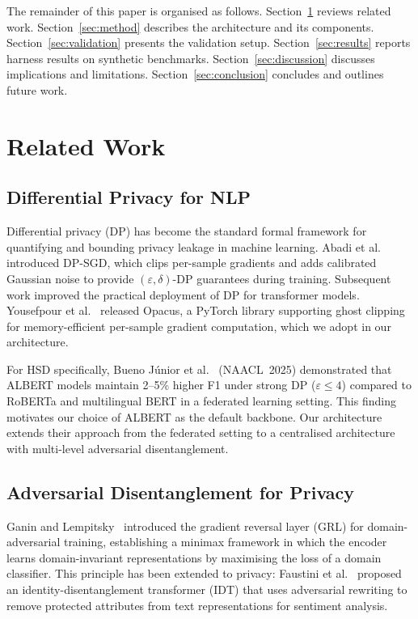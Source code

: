 \documentclass{article}
\begin{document}
\noindent
The remainder of this paper is organised as follows.
Section~\ref{sec:related} reviews related work.
Section~\ref{sec:method} describes the architecture and its components.
Section~\ref{sec:validation} presents the validation setup.
Section~\ref{sec:results} reports harness results on synthetic benchmarks.
Section~\ref{sec:discussion} discusses implications and limitations.
Section~\ref{sec:conclusion} concludes and outlines future work.


\section{Related Work}
\label{sec:related}

\subsection{Differential Privacy for NLP}

Differential privacy (DP) has become the standard formal framework for
quantifying and bounding privacy leakage in machine learning.
Abadi et al.~\cite{abadi2016deep} introduced DP-SGD, which clips
per-sample gradients and adds calibrated Gaussian noise to provide
$(\varepsilon,\delta)$-DP guarantees during training.
Subsequent work improved the practical deployment of DP for transformer
models. Yousefpour et al.~\cite{yousefpour2021opacus} released Opacus,
a PyTorch library supporting ghost clipping for memory-efficient
per-sample gradient computation, which we adopt in our architecture.

For HSD specifically, Bueno J\'unior et al.~\cite{bueno2025privacy}
(NAACL~2025) demonstrated that ALBERT models maintain 2--5\% higher F1 under
strong DP ($\varepsilon\leq4$) compared to RoBERTa and multilingual BERT in a
federated learning setting.
This finding motivates our choice of ALBERT as the default backbone.
Our architecture extends their approach from the federated setting to a
centralised architecture with multi-level adversarial disentanglement.

\subsection{Adversarial Disentanglement for Privacy}

Ganin and Lempitsky~\cite{ganin2015unsupervised} introduced the gradient
reversal layer (GRL) for domain-adversarial training, establishing a
minimax framework in which the encoder learns domain-invariant
representations by maximising the loss of a domain classifier.
This principle has been extended to privacy: Faustini et
al.~\cite{faustini2025idt} proposed an identity-disentanglement transformer
(IDT) that uses adversarial rewriting to remove protected attributes from
text representations for sentiment analysis.
\end{document}
